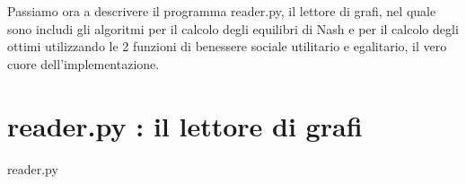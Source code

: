 Passiamo ora a descrivere il programma reader.py, il lettore di grafi, nel quale sono includi gli algoritmi per il calcolo degli equilibri di Nash e per il calcolo degli ottimi utilizzando le 2 funzioni di benessere sociale utilitario e egalitario, il vero cuore dell'implementazione.\\


\section{reader.py : il lettore di grafi}
\justify
reader.py









%
%
%
